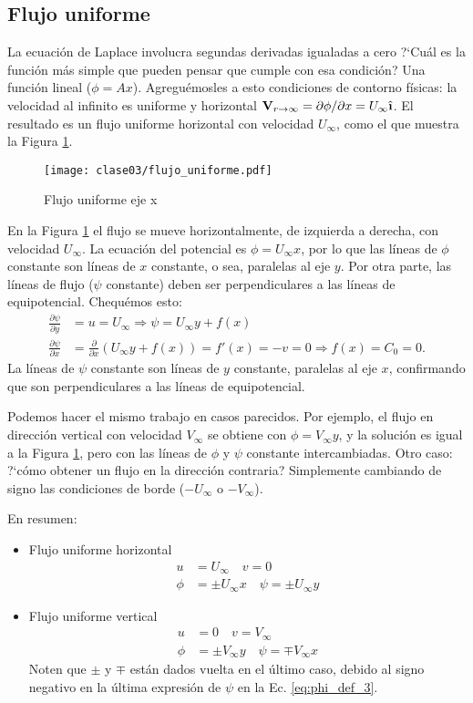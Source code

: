 \subsection*{Flujo uniforme}
La ecuación de Laplace involucra segundas derivadas igualadas a cero
\mbox{?`}Cuál es la función más simple que pueden pensar que cumple con esa condición? Una función lineal ($\phi=Ax$).
Agreguémosles a esto condiciones de contorno físicas: la velocidad al infinito es uniforme y horizontal $\mathbf{V}_{r\to\infty}=\partial\phi/\partial x=U_\infty\ihat$.
El resultado es un flujo uniforme horizontal con velocidad $U_\infty$, como el que muestra la Figura \ref{fig:flujo_uniforme}.
%
\begin{figure}[!h]
\centering
\texttt{[image: clase03/flujo\_uniforme.pdf]}
\caption{Flujo uniforme eje x}
\label{fig:flujo_uniforme}
\end{figure}

En la Figura \ref{fig:flujo_uniforme} el flujo se mueve horizontalmente, de izquierda a derecha, con velocidad $U_\infty$.
La ecuación del potencial es $\phi=U_\infty x$, por lo que las líneas de $\phi$ constante son líneas de $x$ constante, o sea, paralelas al eje $y$.
Por otra parte, las líneas de flujo ($\psi$ constante) deben ser perpendiculares a las líneas de equipotencial.
Chequémos esto:
%
\begin{align}
\frac{\partial\psi}{\partial y} &= u = U_\infty \Rightarrow \psi=U_\infty y + f(x) \nonumber \\
\frac{\partial\psi}{\partial x} &= \frac{\partial}{\partial x}\left(U_\infty y + f(x)\right) = f'(x) = -v = 0 \Rightarrow f(x) = C_0 = 0.
\end{align}
%
La líneas de $\psi$ constante son líneas de $y$ constante, paralelas al eje $x$, confirmando que son perpendiculares a las líneas de equipotencial.

Podemos hacer el mismo trabajo en casos parecidos.
Por ejemplo, el flujo en dirección vertical con velocidad $V_\infty$ se obtiene con $\phi=V_\infty y$, y la solución es igual a la Figura \ref{fig:flujo_uniforme}, pero con las líneas de $\phi$ y $\psi$ constante intercambiadas.
Otro caso: \mbox{?`}cómo obtener un flujo en la dirección contraria? Simplemente cambiando de signo las condiciones de borde ($-U_\infty$ o $-V_\infty$).

En resumen:
%
\begin{itemize}
\item Flujo uniforme horizontal
\begin{align}
u &= U_\infty \quad v = 0 \nonumber \\
\phi&=\pm U_\infty x \quad \psi= \pm U_\infty y
\end{align}

\item Flujo uniforme vertical
\begin{align}
u &= 0 \quad v = V_\infty \nonumber \\
\phi&=\pm V_\infty y \quad \psi= \mp V_\infty x
\end{align}
%
Noten que $\pm$ y $\mp$ están dados vuelta en el último caso, debido al signo negativo en la última expresión de $\psi$ en la Ec. \eqref{eq:phi_def_3}.
\end{itemize}

